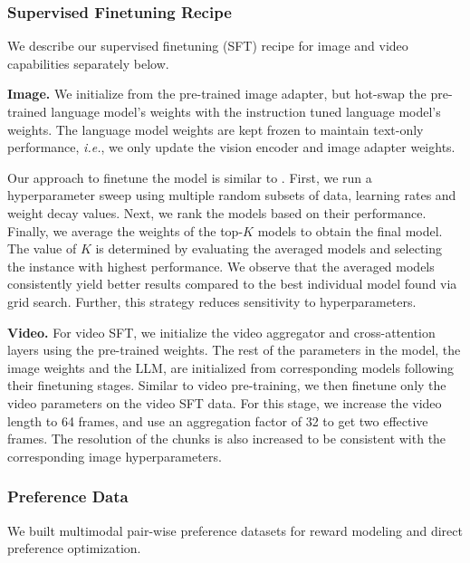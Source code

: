 \subsubsection{Supervised Finetuning Recipe} We describe our supervised finetuning (SFT) recipe for image and video capabilities separately below.

\label{subsubsection:vision_supervised_finetuning_recipe}
\textbf{Image.} We initialize from the pre-trained image adapter, but hot-swap the pre-trained language model's weights with the instruction tuned language model's weights. The language model weights are kept frozen to maintain text-only performance, \textit{i.e.}, we only update the vision encoder and image adapter weights.

Our approach to finetune the model is similar to \cite{wortsman2022modelsoupsaveragingweights}. First, we run a hyperparameter sweep using multiple random subsets of data, learning rates and weight decay values. Next, we rank the models based on their performance. Finally, we average the weights of the top-$K$ models to obtain the final model. The value of $K$ is determined by evaluating the averaged models and selecting the instance with highest performance. We observe that the averaged models consistently yield better results compared to the best individual model found via grid search. Further, this strategy reduces sensitivity to hyperparameters.

\textbf{Video.} For video SFT, we initialize the video aggregator and cross-attention layers using the pre-trained weights. The rest of the parameters in the model, the image weights and the LLM, are initialized from corresponding models following their finetuning stages. Similar to video pre-training, we then finetune only the video parameters on the video SFT data. For this stage, we increase the video length to 64 frames, and use an aggregation factor of 32 to get two effective frames. The resolution of the chunks is also increased to be consistent with the corresponding image hyperparameters.

\subsubsection{Preference Data}
\label{subsubsection:vision_preference_data}
We built multimodal pair-wise preference datasets for reward modeling and direct preference optimization.


